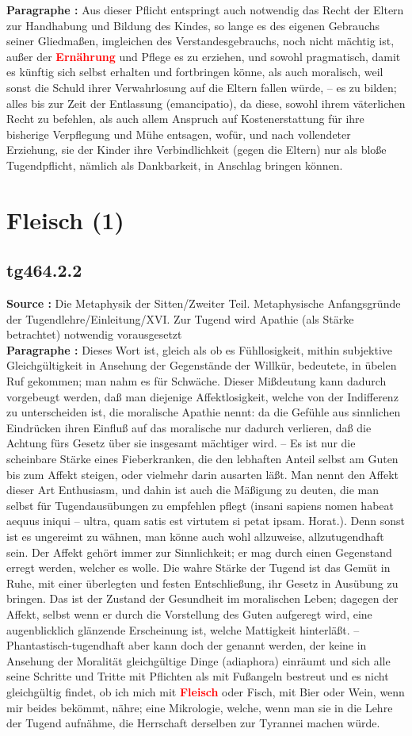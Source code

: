 \documentclass[a4paper,12pt,twoside]{book}
\newcommand{\match}[1]{\textcolor{red}{\textbf{#1}}}
\newcommand{\unnumberedsection}[1]{
	\section*{#1}
	\addcontentsline{toc}{section}{#1}
	\markright{#1}
}
\begin{document}
	\textbf{Paragraphe : }Aus dieser Pflicht entspringt auch notwendig das Recht der Eltern zur Handhabung und Bildung des Kindes, so lange es des eigenen Gebrauchs seiner Gliedmaßen, imgleichen des Verstandesgebrauchs, noch nicht mächtig ist, außer der \match{Ernährung} und Pflege es zu erziehen, und sowohl pragmatisch, damit es künftig sich selbst erhalten und fortbringen  könne, als auch moralisch, weil sonst die Schuld ihrer Verwahrlosung auf die Eltern fallen würde, – es zu bilden; alles bis zur Zeit der Entlassung (emancipatio), da diese, sowohl ihrem väterlichen Recht zu befehlen, als auch allem Anspruch auf Kostenerstattung für ihre bisherige Verpflegung und Mühe entsagen, wofür, und nach vollendeter Erziehung, sie der Kinder ihre Verbindlichkeit (gegen die Eltern) nur als bloße Tugendpflicht, nämlich als Dankbarkeit, in Anschlag bringen können. 
	
	\unnumberedsection{Fleisch (1)} 
	\subsection*{tg464.2.2} 
	\textbf{Source : }Die Metaphysik der Sitten/Zweiter Teil. Metaphysische Anfangsgründe der Tugendlehre/Einleitung/XVI. Zur Tugend wird Apathie (als Stärke betrachtet) notwendig vorausgesetzt\\  
	
	\textbf{Paragraphe : }Dieses Wort ist, gleich als ob es Fühllosigkeit, mithin subjektive Gleichgültigkeit in Ansehung der Gegenstände der Willkür, bedeutete, in übelen Ruf gekommen; man nahm es für Schwäche. Dieser Mißdeutung kann dadurch vorgebeugt werden, daß man diejenige Affektlosigkeit, welche von der Indifferenz zu unterscheiden ist, die moralische Apathie nennt: da die Gefühle aus sinnlichen Eindrücken ihren Einfluß auf das moralische nur dadurch verlieren, daß die Achtung fürs Gesetz über sie insgesamt mächtiger wird. – Es ist nur die scheinbare Stärke eines Fieberkranken, die den lebhaften Anteil selbst am Guten bis zum Affekt steigen, oder vielmehr darin ausarten läßt. Man nennt den Affekt dieser Art Enthusiasm, und dahin ist auch die Mäßigung zu deuten, die man selbst für Tugendausübungen zu empfehlen pflegt (insani sapiens nomen habeat aequus iniqui – ultra, quam satis est virtutem si petat ipsam. Horat.). Denn sonst ist es ungereimt zu wähnen, man könne auch wohl allzuweise, allzutugendhaft sein. Der Affekt gehört immer zur Sinnlichkeit; er mag durch einen Gegenstand erregt werden, welcher es wolle. Die wahre Stärke der Tugend ist das Gemüt in Ruhe, mit einer überlegten und festen Entschließung, ihr Gesetz in Ausübung zu bringen. Das ist der Zustand der Gesundheit im moralischen Leben; dagegen der Affekt, selbst wenn er durch die Vorstellung des Guten aufgeregt wird, eine augenblicklich glänzende Erscheinung ist, welche Mattigkeit hinterläßt. – Phantastisch-tugendhaft aber kann doch der genannt werden, der keine in Ansehung der Moralität gleichgültige Dinge (adiaphora) einräumt und sich alle seine Schritte und Tritte mit Pflichten als mit Fußangeln bestreut und es nicht gleichgültig findet, ob ich mich mit \match{Fleisch} oder Fisch, mit Bier oder Wein, wenn mir beides bekömmt, nähre; eine Mikrologie, welche, wenn man sie in die Lehre der Tugend aufnähme, die Herrschaft derselben zur Tyrannei machen würde. 
	
\end{document}
